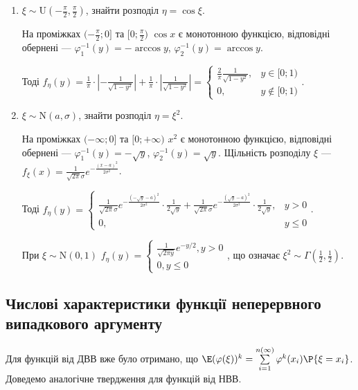 \begin{example}
    \begin{enumerate}
        \item $\xi \sim \mathrm{U}(-\frac{\pi}{2}, \frac{\pi}{2})$, знайти розподіл $\eta = \cos\xi$.

        На проміжках $(-\frac{\pi}{2}; 0]$ та $[0; \frac{\pi}{2})$ $\cos x$ є монотонною функцією, 
        відповідні обернені --- $\varphi_1^{-1} (y) = -\arccos y$, $\varphi_2^{-1} (y) = \arccos y$.

        Тоді $f_\eta (y) = \frac{1}{\pi} \cdot \left| - \frac{1}{\sqrt{1-y^2}}\right| + \frac{1}{\pi} \cdot \left|\frac{1}{\sqrt{1-y^2}}\right| = \begin{cases}
            \frac{2}{\pi} \frac{1}{\sqrt{1-y^2}}, & y \in [0; 1) \\
            0, & y \notin [0; 1)
        \end{cases}$.
        \item $\xi \sim \mathrm{N}(a, \sigma)$, знайти розподіл $\eta = \xi^2$.

        На проміжках $(-\infty; 0]$ та $[0; +\infty)$ $x^2$ є монотонною функцією, 
        відповідні обернені --- $\varphi_1^{-1} (y) = -\sqrt{y}$, $\varphi_2^{-1} (y) = \sqrt{y}$.
        Щільність розподілу $\xi$ --- $f_\xi (x) = \frac{1}{\sqrt{2\pi}\sigma} e^{-\frac{(x-a)^2}{2\sigma^2}}$.

        Тоді $f_\eta (y) = \begin{cases}
            \frac{1}{\sqrt{2\pi}\sigma} e^{-\frac{(-\sqrt{y}-a)^2}{2\sigma^2}} \cdot \frac{1}{2\sqrt{y}} + 
        \frac{1}{\sqrt{2\pi}\sigma} e^{-\frac{(\sqrt{y}-a)^2}{2\sigma^2}} \cdot \frac{1}{2\sqrt{y}}, & y > 0 \\
        0, & y \leq 0
        \end{cases}$.

        При $\xi \sim \mathrm{N}(0, 1)$ $f_\eta(y) = \begin{cases}
            \frac{1}{\sqrt{2\pi y}} e^{-y/2}, y > 0 \\
            0, y \leq 0
        \end{cases}$, що означає $\xi^2 \sim \Gamma(\frac{1}{2}, \frac{1}{2})$.
    \end{enumerate}
\end{example}

\subsection{Числові характеристики функції неперервного випадкового аргументу}
Для функцій від ДВВ вже було отримано, що
$\E(\varphi(\xi))^k = \sum\limits_{i=1}^{n(\infty)} \varphi^k(x_i) \P\{\xi = x_i\}$.
Доведемо аналогічне твердження для функцій від НВВ.

